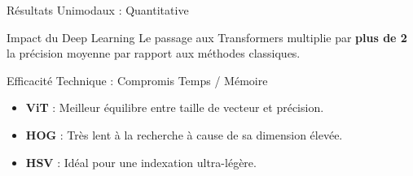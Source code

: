 \documentclass[aspectratio=169]{beamer}
\begin{document}
\begin{frame}{Résultats Unimodaux : Quantitative}
    \begin{table}[]
        \centering
    \end{table}
    \begin{block}{Impact du Deep Learning}
        Le passage aux Transformers multiplie par \textbf{plus de 2} la précision moyenne par rapport aux méthodes classiques.
    \end{block}
\end{frame}

\begin{frame}{Efficacité Technique : Compromis Temps / Mémoire}
    \begin{table}[]
        \centering
    \end{table}
    \begin{itemize}
        \item \textbf{ViT} : Meilleur équilibre entre taille de vecteur et précision.
        \item \textbf{HOG} : Très lent à la recherche à cause de sa dimension élevée.
        \item \textbf{HSV} : Idéal pour une indexation ultra-légère.
    \end{itemize}
\end{frame}
    
\end{document}
